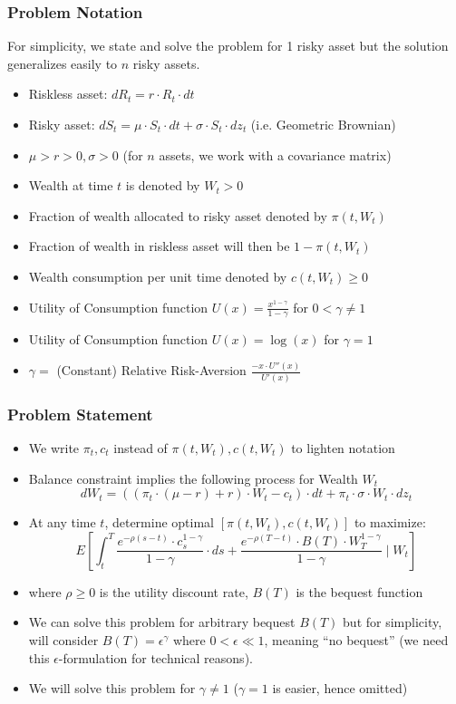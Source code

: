 \documentclass[handout]{beamer}
\begin{document}
\begin{frame}
\frametitle{Problem Notation}
For simplicity, we state and solve the problem for 1 risky asset but the solution generalizes easily to $n$ risky assets.
\pause
\begin{itemize}[<+->]
\item Riskless asset: $dR_t = r \cdot R_t \cdot dt$
\item Risky asset: $dS_t = \mu \cdot S_t \cdot dt + \sigma \cdot S_t \cdot dz_t$ (i.e. Geometric Brownian)
\item $\mu > r > 0, \sigma > 0$ (for $n$ assets, we work with a covariance matrix)
\item Wealth at time $t$ is denoted by $W_t > 0$
\item Fraction of wealth allocated to risky asset denoted by $\pi(t, W_t)$
\item Fraction of wealth in riskless asset will then be $1 - \pi(t, W_t)$
\item Wealth consumption per unit time denoted by $c(t, W_t) \geq 0$
\item Utility of Consumption function $U(x) = \frac {x^{1-\gamma}} {1 - \gamma}$ for $0 < \gamma \neq 1$
\item Utility of Consumption function $U(x) = \log(x)$ for $\gamma = 1$
\item $\gamma =$ (Constant) Relative Risk-Aversion $\frac {-x \cdot U''(x)} {U'(x)}$
\end{itemize}
\end{frame}

\begin{frame}
\frametitle{Problem Statement}
\pause
\begin{itemize}[<+->]
\item We write $\pi_t, c_t$ instead of $\pi(t, W_t), c(t, W_t)$ to lighten notation
\item Balance constraint implies the following process for Wealth $W_t$
$$dW_t = ((\pi_t \cdot (\mu - r) + r) \cdot W_t - c_t) \cdot dt + \pi_t \cdot \sigma \cdot W_t \cdot dz_t$$
\item At any time $t$, determine optimal $[\pi(t,W_t), c(t, W_t)]$ to maximize:
$$E[\int_t^T \frac {e^{-\rho (s-t)} \cdot c_s^{1-\gamma}} {1-\gamma} \cdot ds + \frac {e^{-\rho (T-t)} \cdot B(T) \cdot W_T^{1-\gamma}} {1-\gamma} \mid W_t]$$
\item where $\rho \geq 0$ is the utility discount rate, $B(T)$ is the bequest function
\item We can solve this problem for arbitrary bequest $B(T)$ but for simplicity, will consider $B(T) = \epsilon^{\gamma}$
where $0 < \epsilon \ll 1$, meaning ``no bequest'' (we need this $\epsilon$-formulation for technical reasons).
\item We will solve this problem for $\gamma \neq 1$ ($\gamma = 1$ is easier, hence omitted)
\end{itemize}
\end{frame}
\end{document}
